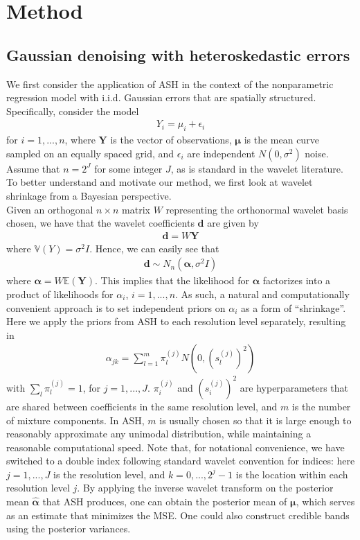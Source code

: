 \documentclass[12pt]{article}
\newcommand{\Ga}{\alpha}
\newcommand{\Ge}{\epsilon}
\newcommand{\s}{\sigma}
\begin{document}
\section{Method}
\subsection{Gaussian denoising with heteroskedastic errors}
We first consider the application of ASH in the context of the nonparametric regression model with i.i.d. Gaussian errors that are spatially structured. Specifically, consider the model
\begin{eqnarray}\label{eq:1d gaussian model}
Y_i=\mu_i+\Ge_i
\end{eqnarray}
for $i=1,...,n$, where $\bm{Y}$ is the vector of observations, $\bm{\mu}$ is the mean curve sampled on an equally spaced grid, and $\Ge_i$ are independent $N(0,\s^2)$ noise. Assume that $n=2^J$ for some integer $J$, as is standard in the wavelet literature. To better understand and motivate our method, we first look at wavelet shrinkage from a Bayesian perspective.\bigskip\\
Given an orthogonal $n\times n$ matrix $W$ representing the orthonormal wavelet basis chosen, we have that the wavelet coefficients $\bm{d}$ are given by
\begin{eqnarray}
\bm{d}=W\bm{Y}
\end{eqnarray}
where $\mathbb{V}(Y)=\s^2I$. Hence, we can easily see that
\begin{eqnarray}\label{eq:waveletcoef}
\bm{d}\sim N_n(\bm{\Ga},\s^2I)
\end{eqnarray}
where $\bm{\Ga}=W\mathbb{E}(\bm{Y})$. This implies that the likelihood for $\bm{\Ga}$ factorizes into a product of likelihoods for $\Ga_i$, $i=1,...,n$. As such, a natural and computationally convenient approach is to set independent priors on $\Ga_i$ as a form of ``shrinkage''. Here we apply the priors from ASH to each resolution level separately, resulting in
\begin{eqnarray}\label{eq:ashprior}
\Ga_{jk}=\sum_{l=1}^m \pi_l^{(j)} N(0,(s_l^{(j)})^2)
\end{eqnarray}
with $\sum_l \pi_l^{(j)}=1$, for $j=1,...,J$. $\pi_i^{(j)}$ and $(s_i^{(j)})^2$ are hyperparameters that are shared between coefficients in the same resolution level, and $m$ is the number of mixture components. In ASH, $m$ is usually chosen so that it is large enough to reasonably approximate any unimodal distribution, while maintaining a reasonable computational speed. Note that, for notational convenience, we have switched to a double index following standard wavelet convention for indices: here $j=1,...,J$ is the resolution level, and $k=0,...,2^j-1$ is the location within each resolution level $j$. By applying the inverse wavelet transform on the posterior mean $\hat{\bm{\Ga}}$ that ASH produces, one can obtain the posterior mean of $\bm{\mu}$, which serves as an estimate that minimizes the MSE. One could also construct credible bands using the posterior variances.\bigskip\\
\end{document}
